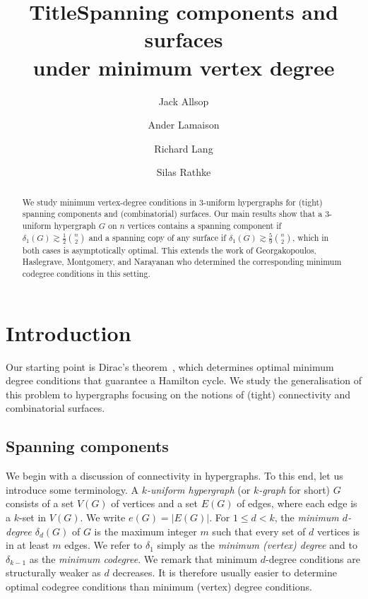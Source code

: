 \documentclass[12pt,reqno]{amsart}
\title{Title}
\title[Spanning components and surfaces under minimum vertex degree]{Spanning components and surfaces \\ under minimum vertex degree}
\author[J.~Allsop]{Jack Allsop}
\author[A.~Lamaison]{Ander Lamaison}
\author[R.~Lang]{Richard Lang}
\author[S.~Rathke]{Silas Rathke}
\theoremstyle{plain}
\theoremstyle{definition}
\numberwithin{equation}{section}
\begin{document}
	
	\begin{abstract}
		We study minimum vertex-degree conditions in $3$-uniform hypergraphs for (tight) spanning components and (combinatorial) surfaces.
		Our main results show that a $3$-uniform hypergraph $G$ on $n$ vertices contains a spanning component if $\delta_1(G) \gtrsim \tfrac{1}{2} \binom{n}{2}$ and a spanning copy of any surface if $\delta_1(G) \gtrsim \tfrac{5}{9} \binom{n}{2}$, which in both cases is asymptotically optimal.
		This extends the work of Georgakopoulos, Haslegrave, Montgomery, and Narayanan who determined the corresponding minimum codegree conditions in this setting.
	\end{abstract}
	
	
	\maketitle
	
	








    
	\section{Introduction}
	
	Our starting point is Dirac's theorem~\cite{Dir52}, which determines optimal minimum degree conditions that guarantee a Hamilton cycle.
	We study the generalisation of this problem to hypergraphs focusing on the notions of (tight) connectivity and combinatorial surfaces.

    
	\subsection{Spanning components}\label{ss:SC}
	
	We begin with a discussion of connectivity in hypergraphs.
	To this end, let us introduce some terminology.
	A \emph{$k$-uniform hypergraph} (or \emph{$k$-graph} for short) $G$ consists of a set $V(G)$ of vertices and a set $E(G)$ of edges, where each edge is a $k$-set in $V(G)$.
	We write $e(G) = |E(G)|$.
	For $1 \leq d <k$, the \emph{minimum $d$-degree $\delta_d(G)$} of $G$ is the maximum integer $m$ such that every set of $d$ vertices is in at least $m$ edges. We refer to $\delta_1$ simply as the \emph{minimum (vertex) degree} and to $\delta_{k-1}$ as the \emph{minimum codegree}.
	We remark that minimum $d$-degree conditions are structurally weaker as $d$ decreases.
	It is therefore usually easier to determine optimal codegree conditions than minimum (vertex) degree conditions.
	
\end{document}

